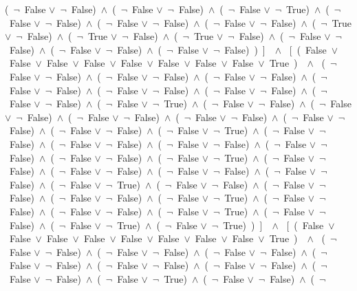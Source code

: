 ﻿\documentclass[a4paper,10pt]{article}
\begin{document}
(\  $\neg$\ False $\vee$\  $\neg$\ False)\ $\wedge$\ (\  $\neg$\ False $\vee$\  $\neg$\ False)\ $\wedge$\ (\  $\neg$\ False $\vee$\  $\neg$\ True)\ $\wedge$\ (\  $\neg$\ False $\vee$\  $\neg$\ False)\ $\wedge$\ (\  $\neg$\ False $\vee$\  $\neg$\ False)\ $\wedge$\ (\  $\neg$\ False $\vee$\  $\neg$\ False)\ $\wedge$\ (\  $\neg$\ True $\vee$\  $\neg$\ False)\ $\wedge$\ (\  $\neg$\ True $\vee$\  $\neg$\ False)\ $\wedge$\ (\  $\neg$\ True $\vee$\  $\neg$\ False)\ $\wedge$\ (\  $\neg$\ False $\vee$\  $\neg$\ False)\ $\wedge$\ (\  $\neg$\ False $\vee$\  $\neg$\ False)\ $\wedge$\ (\  $\neg$\ False $\vee$\  $\neg$\ False)\ )\ ]\ \ $\wedge$ \ [\ (\ False\ $\vee$\ False\ $\vee$\ False\ $\vee$\ False\ $\vee$\ False\ $\vee$\ False\ $\vee$\ False\ $\vee$\ False\ $\vee$\ True\ )\ \ $\wedge$ \ (\  $\neg$\ False $\vee$\  $\neg$\ False)\ $\wedge$\ (\  $\neg$\ False $\vee$\  $\neg$\ False)\ $\wedge$\ (\  $\neg$\ False $\vee$\  $\neg$\ False)\ $\wedge$\ (\  $\neg$\ False $\vee$\  $\neg$\ False)\ $\wedge$\ (\  $\neg$\ False $\vee$\  $\neg$\ False)\ $\wedge$\ (\  $\neg$\ False $\vee$\  $\neg$\ False)\ $\wedge$\ (\  $\neg$\ False $\vee$\  $\neg$\ False)\ $\wedge$\ (\  $\neg$\ False $\vee$\  $\neg$\ True)\ $\wedge$\ (\  $\neg$\ False $\vee$\  $\neg$\ False)\ $\wedge$\ (\  $\neg$\ False $\vee$\  $\neg$\ False)\ $\wedge$\ (\  $\neg$\ False $\vee$\  $\neg$\ False)\ $\wedge$\ (\  $\neg$\ False $\vee$\  $\neg$\ False)\ $\wedge$\ (\  $\neg$\ False $\vee$\  $\neg$\ False)\ $\wedge$\ (\  $\neg$\ False $\vee$\  $\neg$\ False)\ $\wedge$\ (\  $\neg$\ False $\vee$\  $\neg$\ True)\ $\wedge$\ (\  $\neg$\ False $\vee$\  $\neg$\ False)\ $\wedge$\ (\  $\neg$\ False $\vee$\  $\neg$\ False)\ $\wedge$\ (\  $\neg$\ False $\vee$\  $\neg$\ False)\ $\wedge$\ (\  $\neg$\ False $\vee$\  $\neg$\ False)\ $\wedge$\ (\  $\neg$\ False $\vee$\  $\neg$\ False)\ $\wedge$\ (\  $\neg$\ False $\vee$\  $\neg$\ True)\ $\wedge$\ (\  $\neg$\ False $\vee$\  $\neg$\ False)\ $\wedge$\ (\  $\neg$\ False $\vee$\  $\neg$\ False)\ $\wedge$\ (\  $\neg$\ False $\vee$\  $\neg$\ False)\ $\wedge$\ (\  $\neg$\ False $\vee$\  $\neg$\ False)\ $\wedge$\ (\  $\neg$\ False $\vee$\  $\neg$\ True)\ $\wedge$\ (\  $\neg$\ False $\vee$\  $\neg$\ False)\ $\wedge$\ (\  $\neg$\ False $\vee$\  $\neg$\ False)\ $\wedge$\ (\  $\neg$\ False $\vee$\  $\neg$\ False)\ $\wedge$\ (\  $\neg$\ False $\vee$\  $\neg$\ True)\ $\wedge$\ (\  $\neg$\ False $\vee$\  $\neg$\ False)\ $\wedge$\ (\  $\neg$\ False $\vee$\  $\neg$\ False)\ $\wedge$\ (\  $\neg$\ False $\vee$\  $\neg$\ True)\ $\wedge$\ (\  $\neg$\ False $\vee$\  $\neg$\ False)\ $\wedge$\ (\  $\neg$\ False $\vee$\  $\neg$\ True)\ $\wedge$\ (\  $\neg$\ False $\vee$\  $\neg$\ True)\ )\ ]\ \ $\wedge$ \ [\ (\ False\ $\vee$\ False\ $\vee$\ False\ $\vee$\ False\ $\vee$\ False\ $\vee$\ False\ $\vee$\ False\ $\vee$\ False\ $\vee$\ True\ )\ \ $\wedge$ \ (\  $\neg$\ False $\vee$\  $\neg$\ False)\ $\wedge$\ (\  $\neg$\ False $\vee$\  $\neg$\ False)\ $\wedge$\ (\  $\neg$\ False $\vee$\  $\neg$\ False)\ $\wedge$\ (\  $\neg$\ False $\vee$\  $\neg$\ False)\ $\wedge$\ (\  $\neg$\ False $\vee$\  $\neg$\ False)\ $\wedge$\ (\  $\neg$\ False $\vee$\  $\neg$\ False)\ $\wedge$\ (\  $\neg$\ False $\vee$\  $\neg$\ False)\ $\wedge$\ (\  $\neg$\ False $\vee$\  $\neg$\ True)\ $\wedge$\ (\  $\neg$\ False $\vee$\  $\neg$\ False)\ $\wedge$\ (\  $\neg$\ 
\end{document}
